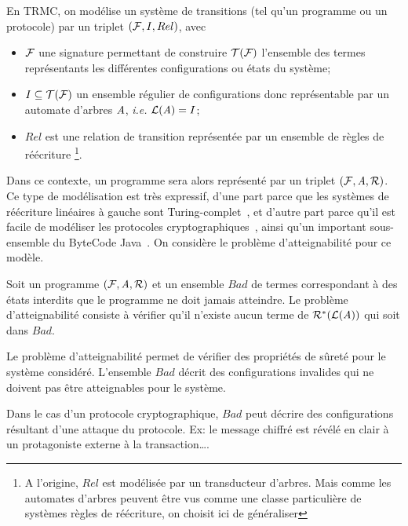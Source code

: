 En TRMC, on modélise un système de transitions (tel qu'un programme ou un protocole) par un triplet $(\mathcal{F}, I, Rel)$,
avec
\begin{itemize}
\item
$\mathcal{F}$ une signature permettant de construire $\mathcal{T(F)}$ l'ensemble des termes représentants les différentes configurations ou états
du système;

\item
  $I \subseteq \mathcal{T(F)}$ un ensemble régulier de configurations donc représentable par un automate d'arbres $\mathit A$, 
  \textit{i.e.} $\mathcal{L}(\mathit A)=I$;

\item $Rel$ est une relation de transition représentée par un ensemble de règles de réécriture
  \footnote{\footnotesize A l'origine, $Rel$ est modélisée par un transducteur d'arbres.
    Mais comme les automates d'arbres peuvent être vus comme une classe particulière de 
    systèmes règles de réécriture, on choisit ici de généraliser}.
\end{itemize}

\noindent
Dans ce contexte, un programme sera alors représenté par un triplet $(\mathcal{F},\mathit A,\mathcal R)$.
Ce type de modélisation est très expressif, d'une part parce que les systèmes de réécriture
linéaires à gauche sont Turing-complet~\cite{HUET-78}, et d'autre part parce qu'il est facile de 
modéliser les protocoles cryptographiques~\cite{GenetK-CADE00}, ainsi qu'un
important sous-ensemble du ByteCode Java~\cite{BoichutGJL-RTA07}.
On considère le problème d'atteignabilité pour ce modèle.

\begin{definition}
\label{def:reachability}
Soit un programme $(\mathcal{F},\mathit A,\mathcal R)$ et un ensemble $Bad$ de termes correspondant à des états
interdits que le programme ne doit jamais atteindre.
Le problème d'atteignabilité consiste à vérifier qu'il n'existe 
aucun terme de $\mathcal R^*(\mathcal{L}(\mathit A))$ qui soit dans $Bad$.
\end{definition}

Le problème d'atteignabilité permet de vérifier des propriétés de sûreté
pour le système considéré. L'ensemble $Bad$ décrit des configurations invalides 
qui ne doivent pas être atteignables pour le système.

Dans le cas d'un protocole cryptographique, $Bad$ peut décrire des
configurations résultant d'une attaque du protocole. Ex: le message
chiffré est révélé en clair à un protagoniste externe à la
transaction\dots.


